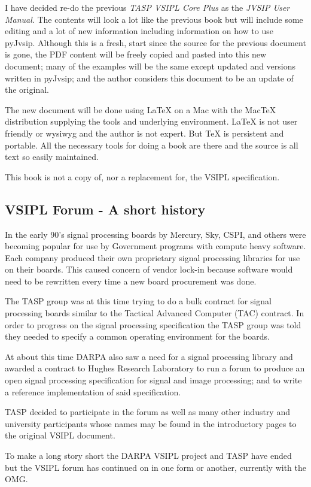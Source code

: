 I have decided re-do the previous \emph{TASP VSIPL Core Plus} as the \emph{JVSIP User Manual}. The contents will look a lot like the previous book but will include some editing and a lot of new information including information on how to use pyJvsip.  Although this is a fresh, start since the source for the previous document is gone, the PDF content will be freely copied and pasted into this new document; many of the examples will be the same except updated and versions written in pyJvsip; and the author considers this document to be an update of the original. 

The new document will be done using LaTeX on a Mac with the MacTeX distribution supplying the tools and underlying environment.  LaTeX is not user friendly or wysiwyg and the author is not expert. But TeX is persistent and portable. All the necessary tools for doing a book are there and the source is all text so easily maintained. 

This book is not a copy of, nor a replacement for, the VSIPL specification.
\subsection*{VSIPL Forum - A short history}
In the early 90's signal processing boards by Mercury, Sky, CSPI, and others were becoming popular for use by Government  programs with compute heavy software.  Each company produced their own proprietary signal processing libraries for use on their boards. This caused concern of vendor lock-in because software would need to be rewritten every time a new board procurement was done.

The TASP group was at this time trying to do a bulk contract for signal processing boards similar to the Tactical Advanced Computer (TAC) contract.  In order to progress on the signal processing specification the TASP group was told they needed to specify a common operating environment for the boards. 

At about this time DARPA also saw a need for a signal processing library and awarded a contract to Hughes Research Laboratory to run a forum to produce an open signal processing specification for signal and image processing; and to write a reference implementation of said specification. 

TASP decided to participate in the forum as well as many other industry and university participants whose names may be found in the introductory pages to the original VSIPL document.

To make a long story short the DARPA VSIPL project and TASP have ended but the VSIPL forum has continued on in one form or another, currently with the OMG.  

